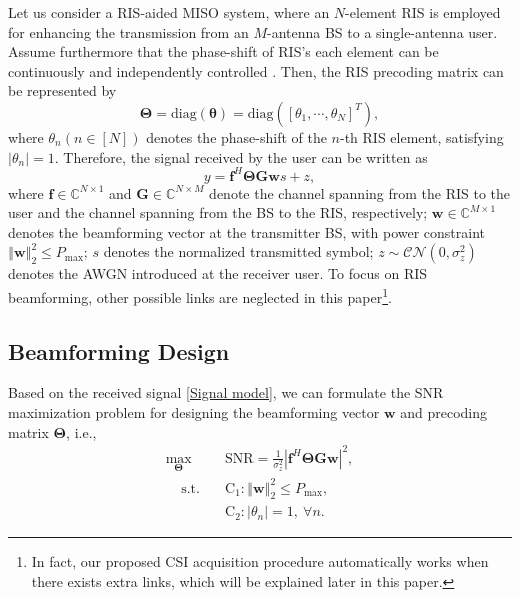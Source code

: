 \documentclass[12pt,draftclsnofoot,journal,onecolumn]{IEEEtran}
\theoremstyle{nonumberplain}
\def \diag {\text{diag}}
\begin{document}
        Let us consider a RIS-aided MISO system, where an $N$-element RIS is employed for enhancing the transmission from an $M$-antenna \ac{BS} to a single-antenna user. Assume furthermore that the phase-shift of RIS's each element can be continuously and independently controlled \cite{wu2019intelligent}. Then, the RIS precoding matrix can be represented by
        \begin{equation}
            \label{RIS}
            \bm \Theta = \diag \left(\bm \theta\right )=\diag \left(\left[\theta_{1},\cdots ,\theta_{N}\right]^{T}\right),
        \end{equation}
        where $\theta_n (n\in[N])$ denotes the phase-shift of the $n$-th RIS element, satisfying $\lvert \theta_n\rvert=1$. Therefore, the signal received by the user can be written as 
        \begin{equation}
            \label{Signal model}
            y=\bm f^{H} \bm\Theta \bm G \bm w s+z,
        \end{equation}
        where $\bm f\in \mathbb C ^{N\times 1}$ and $\bm G \in \mathbb C^{N\times M}$ denote the channel spanning from the RIS to the user and the channel spanning from the BS to the RIS, respectively; $\bm w\in \mathbb C^{M\times 1}$ denotes the beamforming vector at the transmitter BS, with power constraint $\left\Vert \bm w\right \Vert_{2}^{2}\leq P_{\text{max}}$; $s$ denotes the normalized transmitted symbol; $z\sim \mathcal{CN}\left(0,\sigma_{z}^{2}\right)$ denotes the \ac{AWGN} introduced at the receiver user. To focus on RIS beamforming, other possible links are neglected in this paper\footnote{In fact, our proposed CSI acquisition procedure automatically works when there exists extra links, which will be explained later in this paper.}.
        
        \subsection{Beamforming Design}
        \label{Beamforming design}
        Based on the received signal \eqref{Signal model}, we can formulate the \ac{SNR} maximization problem for designing the beamforming vector $\bm w$ and precoding matrix $\bm \Theta$, i.e.,
        \begin{subequations}
\label{optimization}
\begin{align}
\label{objective}
\max_{\bm \Theta}~~&\text{SNR}=\frac{1}{\sigma_{z}^{2}}
\left\vert
\bm f^{H}\bm \Theta\bm G\bm w \right\vert^{2},\\
\label{constraint}
~~~~~\text{s.t.~~~}&\text{C}_{1}: \left\Vert \bm w\right \Vert_{2}^{2}\leq P_{\text{max}},\\
&\text{C}_{2}: \left\vert\theta_{n}\right\vert=1,~\forall n.
\end{align}
\end{subequations}
        
\end{document}
